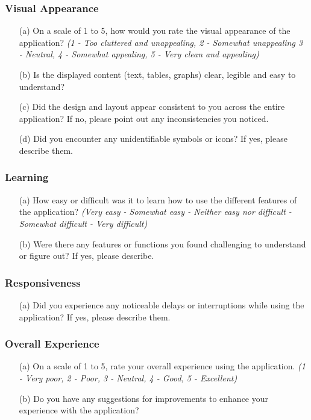 \documentclass[12pt, titlepage]{article}
\begin{document}
\subsubsection*{\textbf{Visual Appearance}}
  \begin{itemize}
    \item[(a)] On a scale of 1 to 5, how would you rate the visual appearance of
    the application? \textit{(1 - Too cluttered and unappealing, 2 - Somewhat
    unappealing 3 - Neutral, 4 - Somewhat appealing, 5 - Very clean and
    appealing)}
    \item[(b)] Is the displayed content (text, tables, graphs) clear, legible
    and easy to understand?
    \item[(c)] Did the design and layout appear consistent to you across the
    entire application? If no, please point out any inconsistencies you noticed.
    \item[(d)] Did you encounter any unidentifiable symbols or icons? If yes,
    please describe them.
  \end{itemize}

\subsubsection*{\textbf{Learning}}
  \begin{itemize}
    \item[(a)] How easy or difficult was it to learn how to use the different
    features of the application? \textit{(Very easy - Somewhat easy - Neither
    easy nor difficult - Somewhat difficult - Very difficult)}
    \item[(b)] Were there any features or functions you found challenging to
    understand or figure out? If yes, please describe. 
  \end{itemize}

\subsubsection*{\textbf{Responsiveness}}
  \begin{itemize}
    \item[(a)] Did you experience any noticeable delays or interruptions while
    using the application? If yes, please describe them.
  \end{itemize}

\subsubsection*{\textbf{Overall Experience}}
  \begin{itemize}
    \item[(a)] On a scale of 1 to 5, rate your overall experience using the
    application. \textit{(1 - Very poor, 2 - Poor, 3 - Neutral, 4 - Good, 5 -
    Excellent)}
    \item[(b)] Do you have any suggestions for improvements to enhance your
    experience with the application?
  \end{itemize}
\end{document}
